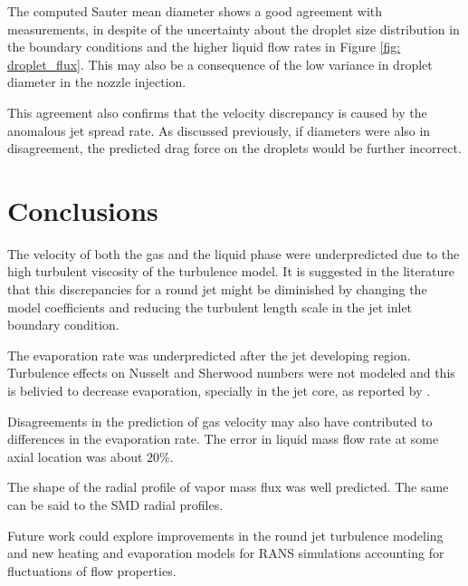 \documentclass[preprint,12pt,review]{elsarticle}
\begin{document}
The computed Sauter mean diameter shows a good agreement with measurements, in despite of the uncertainty about the droplet size distribution in the boundary conditions and the higher liquid flow rates in Figure \ref{fig: droplet_flux}. This may also be a consequence of the low variance in droplet diameter in the nozzle injection.

This agreement also confirms that the velocity discrepancy is caused by the anomalous jet spread rate. As discussed previously, if diameters were also in disagreement, the predicted drag force on the droplets would be further incorrect.

\section{Conclusions}

The velocity of both the gas and the liquid phase were underpredicted due to the high turbulent viscosity of the turbulence model. It is suggested in the literature that this discrepancies for a round jet might be diminished by changing the model coefficients and reducing the turbulent length scale in the jet inlet boundary condition.

The evaporation rate was underpredicted after the jet developing region. Turbulence effects on Nusselt and Sherwood numbers were not modeled and this is belivied to decrease evaporation, specially in the jet core, as reported by \citet{bini}.

Disagreements in the prediction of gas velocity may also have contributed to differences in the evaporation rate. The error in liquid mass flow rate at some axial location was about $20\%$.

The shape of the radial profile of vapor mass flux was well predicted. The same can be said to the SMD radial profiles.

Future work could explore improvements in the round jet turbulence modeling and new heating and evaporation models for RANS simulations accounting for fluctuations of flow properties.




\end{document}
